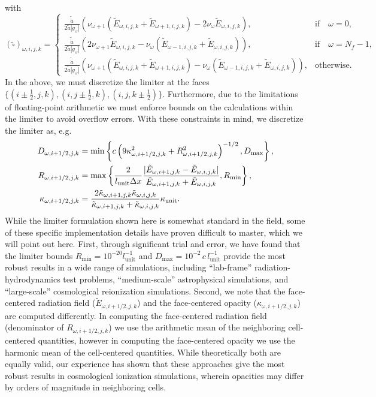 \documentclass[10pt]{article}
\renewcommand{\(}{\left(}
\renewcommand{\)}{\right)}
\newcommand{\adot}{\dot{a}}
\newcommand{\Lunit}{l_{\text{unit}}}
\newcommand{\Kunit}{\kappa_{\text{unit}}}
\newcommand{\tK}{\tilde{\kappa}}
\newcommand{\tE}{\tilde{E}}
\newcommand{\tA}{\tilde{a}}
\newcommand{\tAdot}{\tilde{\adot}}
\begin{document}
with
\begin{equation}
\label{eq:square_omega_normalized_discretized}
  (\tilde{\square})_{\omega,i,j,k} = \begin{cases}
    \frac{\tAdot}{2\tA|g_{\omega}|}\left(
      \nu_{\omega+1} (\tE_{\omega,i,j,k}+\tE_{\omega+1,i,j,k}) - 2\nu_{\omega} \tE_{\omega,i,j,k}\right),&
      \text{if}\quad \omega=0,\\
    \frac{\tAdot}{2\tA|g_{\omega}|}\left(
      2\nu_{\omega+1} \tE_{\omega,i,j,k} - \nu_{\omega} (\tE_{\omega-1,i,j,k}+\tE_{\omega,i,j,k})\right),&
      \text{if}\quad \omega=N_f-1,\\
    \frac{\tAdot}{2\tA|g_{\omega}|}\left(
      \nu_{\omega+1} (\tE_{\omega,i,j,k}+\tE_{\omega+1,i,j,k}) - \nu_{\omega}(\tE_{\omega-1,i,j,k}+\tE_{\omega,i,j,k})\right),& 
      \text{otherwise}.
  \end{cases}
\end{equation}
In the above, we must discretize the limiter at the faces
$\{(i\pm\frac12,j,k),(i,j\pm\frac12,k),(i,j,k\pm\frac12)\}$.
Furthermore, due to the limitations of floating-point arithmetic we
must enforce bounds on the calculations within the limiter to avoid
overflow errors.  With these constraints in mind, we discretize the
limiter as, e.g.
\begin{align}
  \label{eq:discrete_limiter}
  D_{\omega,i+1/2,j,k} &= \min\left\{ c \left(9\kappa_{\omega,i+1/2,j,k}^2 + R_{\omega,i+1/2,j,k}^2\right)^{-1/2},
    D_\text{max} \right\},\\
  \notag
  R_{\omega,i+1/2,j,k} &= \max\left\{\frac{2}{\Lunit \Delta x} \frac{|\tE_{\omega,i+1,j,k}-\tE_{\omega,i,j,k}|}{\tE_{\omega,i+1,j,k}+\tE_{\omega,i,j,k}}, R_\text{min} \right\}, \\
  \notag
  \kappa_{\omega,i+1/2,j,k} &= \frac{2 \tK_{\omega,i+1,j,k} \tK_{\omega,i,j,k}}{\tK_{\omega,i+1,j,k} + \tK_{\omega,i,j,k}}\Kunit.
\end{align}
While the limiter formulation shown here is somewhat standard in the
field, some of these specific implementation details have proven
difficult to master, which we will point out here.  First, through
significant trial and error, we have found that the limiter
bounds $R_\text{min}=10^{-20} \Lunit^{-1}$ and 
$D_\text{max}=10^{-2}\, c\, \Lunit^{-1}$ provide the most robust results
in a wide range of simulations, including ``lab-frame''
radiation-hydrodynamics test problems, ``medium-scale'' astrophysical
simulations, and ``large-scale'' cosmological reionization
simulations.  Second, we note that the face-centered radiation field
($\tE_{\omega,i+1/2,j,k}$) and the face-centered opacity
($\kappa_{\omega,i+1/2,j,k}$) are computed differently.  In computing
the face-centered radiation field (denominator of
$R_{\omega,i+1/2,j,k}$) we use the arithmetic mean of the neighboring 
cell-centered quantities, however in computing the face-centered
opacity we use the harmonic mean of the cell-centered quantities.
While theoretically both are equally valid, our experience has shown
that these approaches give the most robust results in cosmological
ionization simulations, wherein opacities may differ by orders of
magnitude in neighboring cells.
\end{document}
